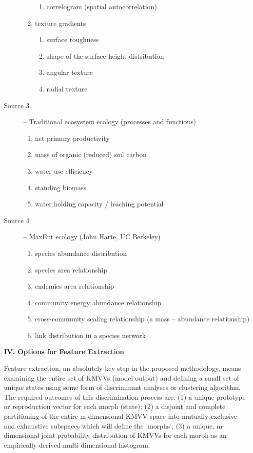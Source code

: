 \documentclass[12pt]{article}
\begin{document}
\begin{description}
\begin{enumerate}
\begin{enumerate}
			\item correlogram (spatial autocorrelation)
		\end{enumerate}
		\item texture gradients 
		\begin{enumerate}
			\item surface roughness 
			\item shape of the surface height distribution 
			\item angular texture 
			\item radial texture
		\end{enumerate}
	\end{enumerate}
	\item[Source 3] -- Traditional ecosystem ecology (processes and functions)
	\begin{enumerate}
		\item net primary productivity 
		\item mass of organic (reduced) soil carbon 
		\item water use efficiency
		\item standing biomass 
		\item water holding capacity / leaching potential 
	\end{enumerate}
	\item[Source 4] -- MaxEnt ecology (John Harte, UC Berkeley) 
	\begin{enumerate}
		\item species abundance distribution
		\item species area relationship 
		\item endemics area relationship 
		\item community energy abundance relationship 
		\item cross-community scaling relationship (a mass -- abundance relationship) 
		\item link distribution in a species network
	\end{enumerate}
\end{description}

\vspace{5mm}
\centerline{\textbf{IV. Options for Feature Extraction}}
Feature extraction, an absolutely key step in the proposed methodology, means examining the entire set of KMVVs (model output) and defining a small set of unique states using some form of discriminant analyses or clustering algorithm. The required outcomes of this discrimination process are: (1) a unique prototype or reproduction vector for each morph (state); (2) a disjoint and complete partitioning of the entire m-dimensional KMVV space into mutually exclusive and exhaustive subspaces which will define the 'morphs'; (3) a unique, m-dimensional joint probability distribution of KMVVs for each morph as an empirically-derived multi-dimensional histogram.\\
\end{document}
